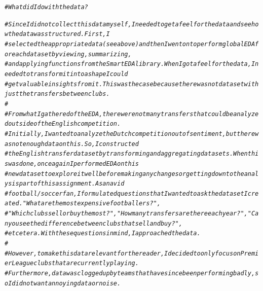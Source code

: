 \documentclass{article}\usepackage[]{graphicx}\usepackage[]{color}
\makeatletter
\newcommand{\hlcom}[1]{\textcolor[rgb]{0.678,0.584,0.686}{\textit{#1}}}%
\newenvironment{kframe}{%
 \def\at@end@of@kframe{}%
 \ifinner\ifhmode%
  \def\at@end@of@kframe{\end{minipage}}%
  \begin{minipage}{\columnwidth}%
 \fi\fi%
 \def\FrameCommand##1{\hskip\@totalleftmargin \hskip-\fboxsep
 \colorbox{shadecolor}{##1}\hskip-\fboxsep
     \hskip-\linewidth \hskip-\@totalleftmargin \hskip\columnwidth}%
 \MakeFramed {\advance\hsize-\width
   \@totalleftmargin\z@ \linewidth\hsize
   \@setminipage}}%
 {\par\unskip\endMakeFramed%
 \at@end@of@kframe}
\newenvironment{knitrout}{}{} %
\makeatother
\begin{document}
\begin{knitrout}
\begin{kframe}
\begin{alltt}
\hlcom{# What did I do with the data?}

\hlcom{# Since I did not collect this data myself, I needed to get a feel for the data and see how the data was structured. First, I }
\hlcom{# selected the appropriate data (see above) and then I went on to perform global EDA for each data set by viewing, summarizing, }
\hlcom{# and applying functions from the SmartEDA library. When I got a feel for the data, I needed to transform it into a shape I could}
\hlcom{# get valuable insights from it. This was the case because there was not data set with just the transfers between clubs.}
\hlcom{# }
\hlcom{# From what I gathered of the EDA, there were not many transfers that could be analyzed outside of the English competition. }
\hlcom{# Initially, I wanted to analyze the Dutch competition out of sentiment, but there was not enough data on this. So, I constructed}
\hlcom{# the English transfer data set by transforming and aggregating data sets. When this was done, once again I performed EDA on this}
\hlcom{# new data set to explore it well before making any changes or getting down to the analysis part of this assignment. As an avid}
\hlcom{# football/soccer fan, I formulated questions that I wanted to ask the data set I created. "What are the most expensive footballers?",}
\hlcom{# "Which clubs sell or buy the most?", "How many transfers are there each year?", "Can you see the difference between clubs that sell and buy?",}
\hlcom{# et cetera. With these questions in mind, I approached the data.}
\hlcom{# }
\hlcom{# However, to make this data relevant for the reader, I decided to only focus on Premier League clubs that are currently playing.}
\hlcom{# Furthermore, data was clogged up by teams that have since been performing badly, so I did not want annoying data or noise.}


\end{alltt}
\end{kframe}
\end{knitrout}
\end{document}

